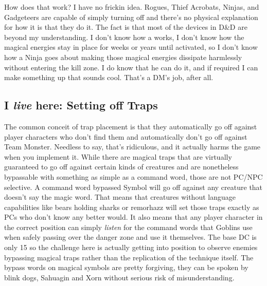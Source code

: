How does that work? I have no frickin idea. Rogues, Thief Acrobats, Ninjas, and Gadgeteers are capable of simply turning off  and there's no physical explanation for how it is that they do it. The fact is that most of the devices in D\&D are beyond my understanding. I don't know how a  works, I don't know how the magical energies stay in place for weeks or years until activated, so I don't know how a Ninja goes about making those magical energies dissipate harmlessly without entering the kill zone. I do know that he can do it, and if required I can make something up that sounds cool. That's a DM's job, after all.


\subsection{I \textit{live} here: Setting off Traps}
\vspace*{-8pt}

The common conceit of trap placement is that they automatically go off against player characters who don't find them and automatically don't go off against Team Monster. Needless to say, that's ridiculous, and it actually harms the game when you implement it. While there are magical traps that are virtually guaranteed to go off against certain kinds of creatures and are nonetheless bypassable with something as simple as a command word, those are not PC/NPC selective. A command word bypassed Symbol will go off against any creature that doesn't say the magic word. That means that creatures without language capabilities like bears holding sharks or remorhazz will set those traps exactly as PCs who don't know any better would. It also means that any player character in the correct position can simply \textit{listen} for the command words that Goblins use when safely passing over the danger zone and use it themselves. The base DC is only 15 so the challenge here is actually getting into position to observe enemies bypassing magical traps rather than the replication of the technique itself. The bypass words on magical symbols are pretty forgiving, they can be spoken by blink dogs, Sahuagin and Xorn without serious risk of misunderstanding.


